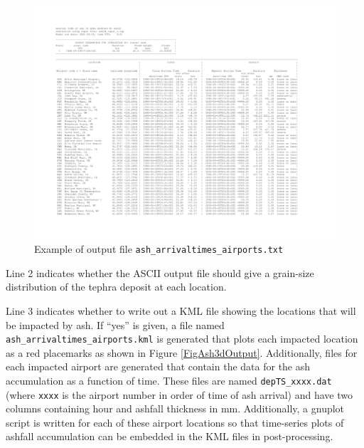 \begin{figure}[htbp]\vspace*{-5cm}\hspace*{-2cm}
\includegraphics[angle=90,scale=0.9]{Figures/Chap_Usage_asharrivaltimesairports_p1.pdf}
\parbox{15cm}{\caption{\label{FigAshArrivTimeFormat}
Example of output file \texttt{ash\_arrivaltimes\_airports.txt}
}}
\end{figure}

Line 2 indicates whether the ASCII output file should give a grain-size distribution
of the tephra deposit at each location.

Line 3 indicates whether to write out a KML file showing the locations that will be
impacted by ash. If ``yes'' is given, a file named
\texttt{ash\_arrivaltimes\_airports.kml} is generated
that plots each impacted location as a red placemarks as shown in
Figure \ref{FigAsh3dOutput}.
Additionally, files for each impacted airport are generated that contain the data
for the ash accumulation as a function of time. These files are named
\texttt{depTS\_xxxx.dat} (where \texttt{xxxx} is the airport number in order of
time of ash arrival) and have two columns containing hour and ashfall thickness
in $\mathrm{mm}$. Additionally, a gnuplot script is written for each of these
airport locations so that time-series plots of ashfall accumulation can be embedded
in the KML files in post-processing.

